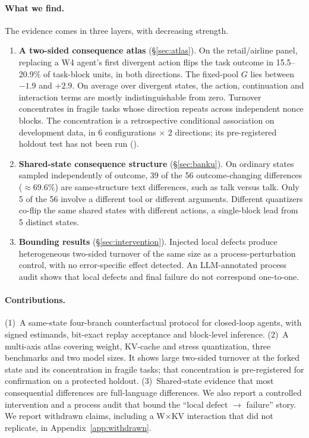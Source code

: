 \paragraph{What we find.} The evidence comes in three layers, with decreasing strength.
\begin{enumerate}[leftmargin=*,itemsep=1pt,topsep=2pt]
\item \textbf{A two-sided consequence atlas} (\S\ref{sec:atlas}). On the \tautwo{} retail/airline panel, replacing a W4 agent's first divergent action flips the task outcome in 15.5--20.9\% of task-block units, in both directions. The fixed-pool $G$ lies between $-1.9$ and $+2.9$\pp{}. %
On average over divergent states, the action, continuation and interaction terms are mostly indistinguishable from zero. Turnover concentrates in fragile tasks whose direction repeats across independent nonce blocks. The concentration is a retrospective conditional association on development data, in 6 configurations $\times$ 2 directions; its pre-registered holdout test has not been run (). %
\item \textbf{Shared-state consequence structure} (\S\ref{sec:banku}). On ordinary states sampled independently of outcome, 39 of the 56 outcome-changing differences ($\approx$69.6\%) are same-structure text differences, such as talk versus talk. Only 5 of the 56 involve a different tool or different arguments. Different quantizers co-flip the same shared states with different actions, a single-block lead from 5 distinct states. %
\item \textbf{Bounding results} (\S\ref{sec:intervention}). Injected local defects produce heterogeneous two-sided turnover of the same size as a process-perturbation control, with no error-specific effect detected. An LLM-annotated process audit shows that local defects and final failure do not correspond one-to-one.
\end{enumerate}

\paragraph{Contributions.} (1)~A same-state four-branch counterfactual protocol for closed-loop agents, with signed estimands, bit-exact replay acceptance and block-level inference. (2)~A multi-axis atlas covering weight, KV-cache and stress quantization, three benchmarks and two model sizes. It shows large two-sided turnover at the forked state and its concentration in fragile tasks; that concentration is pre-registered for confirmation on a protected holdout. (3)~Shared-state evidence that most consequential differences are full-language differences. We also report a controlled intervention and a process audit that bound the ``local defect $\rightarrow$ failure'' story. We report withdrawn claims, including a W$\times$KV interaction that did not replicate, in Appendix~\ref{app:withdrawn}.

